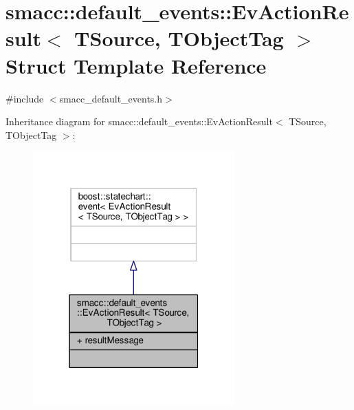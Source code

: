 \hypertarget{structsmacc_1_1default__events_1_1EvActionResult}{}\section{smacc\+:\+:default\+\_\+events\+:\+:Ev\+Action\+Result$<$ T\+Source, T\+Object\+Tag $>$ Struct Template Reference}
\label{structsmacc_1_1default__events_1_1EvActionResult}


{\ttfamily \#include $<$smacc\+\_\+default\+\_\+events.\+h$>$}



Inheritance diagram for smacc\+:\+:default\+\_\+events\+:\+:Ev\+Action\+Result$<$ T\+Source, T\+Object\+Tag $>$\+:\nopagebreak
\begin{figure}[H]
\begin{center}
\leavevmode
\includegraphics[width=220pt]{structsmacc_1_1default__events_1_1EvActionResult__inherit__graph}
\end{center}
\end{figure}


